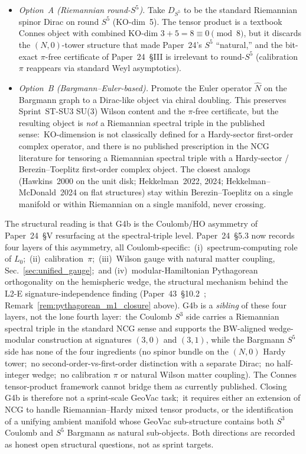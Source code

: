 \documentclass[11pt]{article}
\begin{document}
\begin{itemize}\setlength{\itemsep}{2pt}
\item \emph{Option~A (Riemannian round-$S^5$).}  Take $D_{S^5}$ to
be the standard Riemannian spinor Dirac on round $S^5$ (KO-dim~5).
The tensor product is a textbook Connes object with combined
KO-dim $3 + 5 = 8 \equiv 0 \pmod 8$, but it discards the
$(N, 0)$-tower structure that made Paper~24's $S^5$ ``natural,''
and the bit-exact $\pi$-free certificate of Paper~24~\S III is
irrelevant to round-$S^5$ (calibration $\pi$ reappears via standard
Weyl asymptotics).
\item \emph{Option~B (Bargmann--Euler-based).}  Promote the Euler
operator $\hat{N}$ on the Bargmann graph to a Dirac-like object via
chiral doubling.  This preserves Sprint~ST-SU3 SU(3) Wilson content
and the $\pi$-free certificate, but the resulting object is
\emph{not} a Riemannian spectral triple in the published sense:\
KO-dimension is not classically defined for a Hardy-sector
first-order complex operator, and there is no published prescription
in the NCG literature for tensoring a Riemannian spectral triple
with a Hardy-sector / Berezin--Toeplitz first-order complex object.
The closest analogs (Hawkins~2000 on the unit disk;
Hekkelman~2022, 2024; Hekkelman--McDonald~2024 on flat structures)
stay within Berezin--Toeplitz on a single manifold or within
Riemannian on a single manifold, never crossing.
\end{itemize}

The structural reading is that G4b is the Coulomb/HO
asymmetry of Paper~24~\S V resurfacing at the spectral-triple level.
Paper~24~\S 5.3 now records four layers of this asymmetry, all
Coulomb-specific:\ (i)~spectrum-computing role of $L_0$;\
(ii)~calibration~$\pi$;\ (iii)~Wilson gauge with natural matter
coupling, Sec.~\ref{sec:unified_gauge};\ and (iv)~modular-Hamiltonian
Pythagorean orthogonality on the hemispheric wedge, the structural
mechanism behind the L2-E signature-independence finding
(Paper~43~\S 10.2~\cite{paper43};
Remark~\ref{rem:pythagorean_m1_closure} above).  G4b is a
\emph{sibling} of these four layers, not the lone fourth layer:\ the
Coulomb $S^3$ side carries a Riemannian spectral triple in the
standard NCG sense and supports the BW-aligned wedge-modular
construction at signatures $(3, 0)$ and $(3, 1)$, while the Bargmann
$S^5$ side has none of the four ingredients (no spinor bundle on
the $(N, 0)$ Hardy tower;\ no second-order-vs-first-order distinction
with a separate Dirac;\ no half-integer wedge;\ no calibration $\pi$
or natural Wilson matter coupling). The Connes tensor-product
framework cannot bridge them as currently published.  Closing G4b is
therefore not a sprint-scale GeoVac task;\ it requires either an
extension of NCG to handle Riemannian--Hardy mixed tensor products,
or the identification of a unifying ambient manifold whose GeoVac
sub-structure contains both $S^3$ Coulomb and $S^5$ Bargmann as
natural sub-objects.  Both directions are recorded as honest open
structural questions, not as sprint targets.
\end{document}
